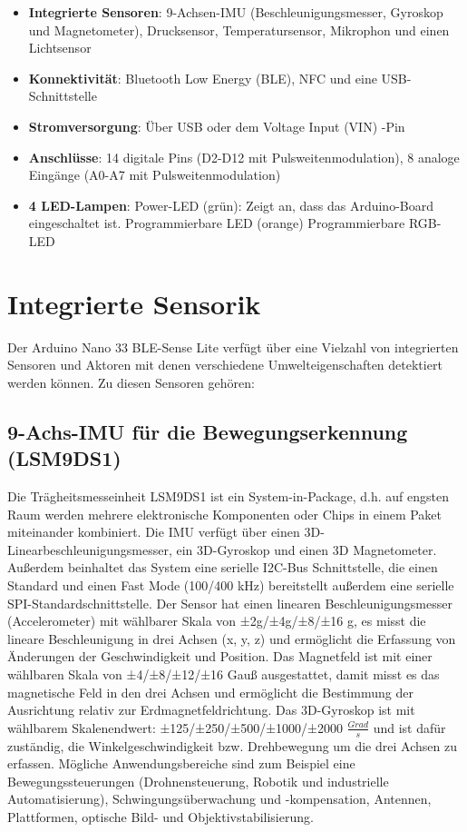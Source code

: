 \begin{itemize}
	\item \textbf{Integrierte Sensoren}: 9-Achsen-IMU (Beschleunigungsmesser, Gyroskop und Magnetometer), Drucksensor, Temperatursensor, Mikrophon und einen Lichtsensor
	\item \textbf{Konnektivität}: Bluetooth Low Energy (BLE), NFC und eine USB-Schnittstelle
	\item \textbf{Stromversorgung}: Über USB oder dem Voltage Input (VIN) -Pin
	\item \textbf{Anschlüsse}: 14 digitale Pins (D2-D12 mit Pulsweitenmodulation), 8 analoge Eingänge (A0-A7 mit Pulsweitenmodulation) 
	\item  \textbf{4 LED-Lampen}: 
	\subitem Power-LED (grün): Zeigt an, dass das Arduino-Board eingeschaltet ist.
	\subitem Programmierbare LED (orange)
	\subitem Programmierbare RGB-LED
\end{itemize}

\section{Integrierte Sensorik}
Der Arduino Nano 33 BLE-Sense Lite verfügt über eine Vielzahl von integrierten Sensoren und Aktoren mit denen verschiedene Umwelteigenschaften detektiert werden können. Zu diesen Sensoren gehören:
\subsection{9-Achs-IMU für die Bewegungserkennung (LSM9DS1)}
	Die Trägheitsmesseinheit LSM9DS1 ist ein System-in-Package, d.h. auf engsten Raum werden mehrere elektronische Komponenten oder Chips in einem Paket miteinander kombiniert.\cite{Wag} Die IMU verfügt über einen 3D-Linearbeschleunigungsmesser, ein 3D-Gyroskop und einen 3D Magnetometer. Außerdem beinhaltet das System eine serielle I2C-Bus Schnittstelle, die einen Standard und einen Fast Mode (100/400 kHz) bereitstellt außerdem eine serielle SPI-Standardschnittstelle. Der Sensor hat einen linearen Beschleunigungsmesser (Accelerometer) mit wählbarer Skala von ±2g/±4g/±8/±16 g, es misst die lineare Beschleunigung in drei Achsen (x, y, z) und ermöglicht die Erfassung von Änderungen der Geschwindigkeit und Position. Das Magnetfeld ist mit einer wählbaren Skala von ±4/±8/±12/±16 Gauß ausgestattet, damit misst es das magnetische Feld in den drei Achsen und ermöglicht die Bestimmung der Ausrichtung relativ zur Erdmagnetfeldrichtung. Das 3D-Gyroskop ist mit wählbarem Skalenendwert: ±125/±250/±500/±1000/±2000 $\frac{Grad}{s}$ und ist dafür zuständig, die Winkelgeschwindigkeit bzw. Drehbewegung um die drei Achsen zu erfassen.\cite{STM1}
	Mögliche Anwendungsbereiche sind zum Beispiel eine Bewegungssteuerungen (Drohnensteuerung, Robotik und industrielle Automatisierung), Schwingungsüberwachung und -kompensation, Antennen, Plattformen, optische Bild- und Objektivstabilisierung.  
